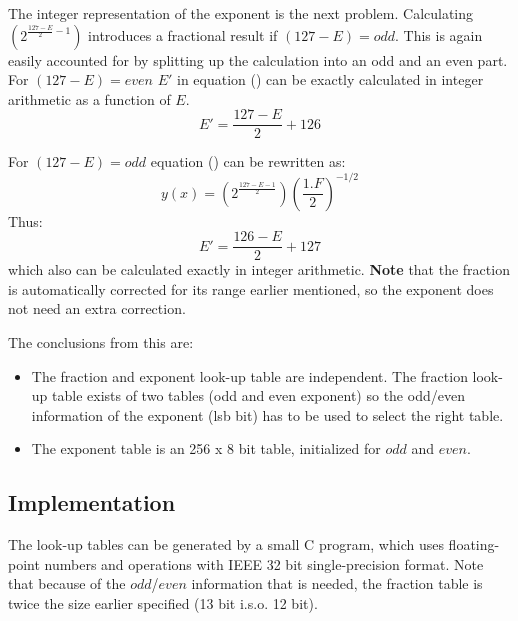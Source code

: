 The integer representation of the exponent is the next problem. Calculating
$(2^{\frac{127-E}{2}-1})$ introduces a fractional result if $(127-E) = odd$.
This is again easily accounted for by splitting up the calculation into an
odd and an even part. For $(127-E) = even$ $E'$ in equation ()
can be exactly calculated in integer arithmetic as a function of $E$.
\begin{equation}
E' = \frac{127-E}{2} + 126
\end{equation}

For $(127-E) = odd$ equation () can be rewritten as:
\begin{equation}
y(x) = (2^{\frac{127-E-1}{2}})(\frac{1.F}{2})^{-1/2}
\end{equation}
Thus:
\begin{equation}
E' = \frac{126-E}{2} + 127
\end{equation}
which also can be calculated exactly in integer arithmetic.
{\bf Note} that the fraction is automatically corrected for its range earlier
mentioned, so the exponent does not need an extra correction.

The conclusions from this are:
\begin{itemize}
\item The fraction and exponent look-up table are independent. The fraction
look-up table exists of two tables (odd and even exponent) so the odd/even
information of the exponent (lsb bit) has to be used to select the right
table.
\item The exponent table is an 256 x 8 bit table, initialized for $odd$
and $even$.%
\end{itemize}

\subsection{Implementation}
The look-up tables can be generated by a small C program, which uses
floating-point numbers and operations with IEEE 32 bit single-precision format.
Note that because of the $odd$/$even$ information that is needed, the
fraction table is twice the size earlier specified (13 bit i.s.o. 12 bit).

